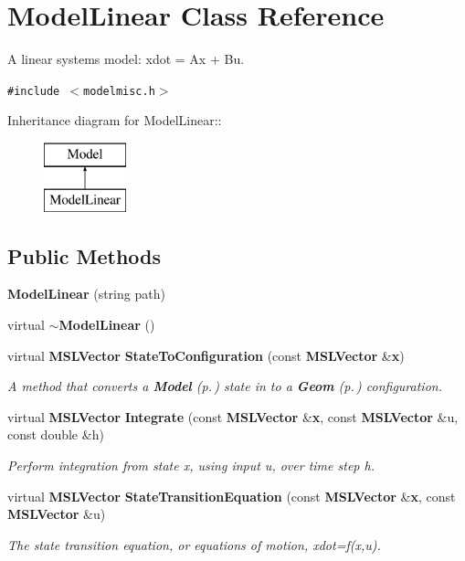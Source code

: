 \section{Model\-Linear  Class Reference}
\label{classModelLinear}
A linear systems model: xdot = Ax + Bu. 


{\tt \#include $<$modelmisc.h$>$}

Inheritance diagram for Model\-Linear::\begin{figure}[H]
\begin{center}
\leavevmode
\includegraphics[height=2cm]{classModelLinear}
\end{center}
\end{figure}
\subsection*{Public Methods}
\begin{CompactItemize}
\item 
{\bf Model\-Linear} (string path)
\item 
virtual {\bf $\sim$Model\-Linear} ()
\item 
virtual {\bf MSLVector} {\bf State\-To\-Configuration} (const {\bf MSLVector} \&{\bf x})
\begin{CompactList}\small\item\em A method that converts a {\bf Model} {\rm (p.\,\pageref{classModel})} state in to a {\bf Geom} {\rm (p.\,\pageref{classGeom})} configuration.\item\end{CompactList}\item 
virtual {\bf MSLVector} {\bf Integrate} (const {\bf MSLVector} \&{\bf x}, const {\bf MSLVector} \&u, const double \&h)
\begin{CompactList}\small\item\em Perform integration from state x, using input u, over time step h.\item\end{CompactList}\item 
virtual {\bf MSLVector} {\bf State\-Transition\-Equation} (const {\bf MSLVector} \&{\bf x}, const {\bf MSLVector} \&u)
\begin{CompactList}\small\item\em The state transition equation, or equations of motion, xdot=f(x,u).\item\end{CompactList}\end{CompactItemize}
